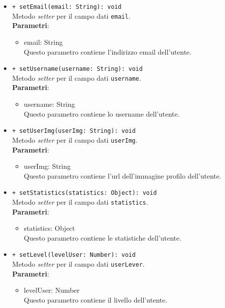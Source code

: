 \begin{itemize}
\begin{itemize}
				\item \texttt{+ setEmail(email: String): void} \\
				Metodo \textit{setter} per il campo dati \texttt{email}.\\
				\textbf{Parametri}:
				\begin{itemize}
					\item {email: String}\\
					Questo parametro contiene l'indirizzo email dell'utente.
				\end{itemize}
				
				\item \texttt{+ setUsername(username: String): void} \\
				Metodo \textit{setter} per il campo dati \texttt{username}.\\
				\textbf{Parametri}:
				\begin{itemize}
					\item {username: String}\\
					Questo parametro contiene lo username dell'utente.
				\end{itemize}
				
				\item \texttt{+ setUserImg(userImg: String): void} \\
				Metodo \textit{setter} per il campo dati \texttt{userImg}.\\
				\textbf{Parametri}:
				\begin{itemize}
					\item {userImg: String}\\
					Questo parametro contiene l'url dell'immagine profilo dell'utente.
				\end{itemize}
				
				\item \texttt{+ setStatistics(statistics: Object): void} \\
				Metodo \textit{setter} per il campo dati \texttt{statistics}.\\
				\textbf{Parametri}:
				\begin{itemize}
					\item {statistics: Object}\\
					Questo parametro contiene le statistiche dell'utente.
				\end{itemize}
				
				\item \texttt{+ setLevel(levelUser: Number): void} \\
				Metodo \textit{setter} per il campo dati \texttt{userLever}.\\
				\textbf{Parametri}:
				\begin{itemize}
					\item {levelUser: Number}\\
					Questo parametro contiene il livello dell'utente.
				\end{itemize}
				

\end{itemize}
\end{itemize}

